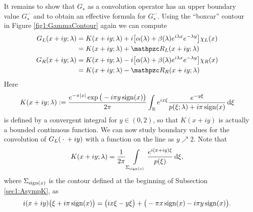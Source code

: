 \documentclass[../dissertation.tex]{subfiles}
\begin{document}
It remains to show that $G_\star$ as a convolution operator has an upper boundary 
value $G_\star^-$ and to obtain an ef{}fective formula for $G_\star^-$. Using the 
``boxcar'' contour in Figure \ref{fig1:GammaContour} again we can compute
\begin{subequations}
	\label{eq3:ILW.GFz.rep}
	\begin{align}
		\label{eq3:ILW.GLz.rep}
		G_L(x+ iy; \lambda)
			&= 
				K(x+iy; \lambda) 
				+ i \big[
						\alpha(\lambda) + \beta(\lambda) e^{i\lambda x}e^{-\lambda y} 
					\big] \chi_L(x) \\
			&= 
				K(x+iy; \lambda) + \mathpzc R_L(x+iy; \lambda) 
				\nonumber \\
		G_R(x+ iy; \lambda)
			&= 
				K(x+iy; \lambda) 
				- i \big[
						\alpha(\lambda) + \beta(\lambda) e^{i\lambda x}e^{-\lambda y} 
					\big] \chi_R(x) \\
			&= 
				K(x+iy; \lambda) - \mathpzc R_R(x+iy; \lambda) 
				\nonumber
\end{align}
\end{subequations}
Here
\begin{equation}
	\label{eq3:ILW.K.z}
	K(x + iy; \lambda) 
				:= \frac{e^{-\pi|x|} \exp\big(- i \pi y \operatorname{sign}(x)  \big)}{2\pi} 
					\int_{\mathbb R} e^{i x \xi} 
						\frac{e^{-y\xi}}{p(\xi; \lambda) + i \pi \operatorname{sign}(x)}
					\, \mathrm{d}\xi
\end{equation}
is defined by a convergent integral for $y \in (0,2)$, so that $K(x+iy)$ is actually 
a bounded continuous function. We can now study boundary values for the convolution of 
$G_L(\kern 0.5ex \cdot \kern 0.5ex+iy)$ with a function on the line as $y \nearrow 2$.  Note that
\[
	K(x + iy; \lambda)
		= \frac{1}{2 \pi} \int\limits_{\Sigma_{\operatorname{sign}(x)}} \frac{e^{i(x + iy) \xi}}{p(\xi)} \, \mathrm{d}\xi,
\]
where $\Sigma_{\operatorname{sign}(x)}$ is the contour defined at the beginning of Subsection \ref{sec1:AsympK},
as 
\[
	i(x + iy)\big(\xi + i \pi \operatorname{sign}(x) \big)
		= \big( i x \xi - y \xi\big) 
			+ \big( -\pi x \operatorname{sign}(x) - i \pi y \operatorname{sign}(x) \big).
\]
\end{document}
